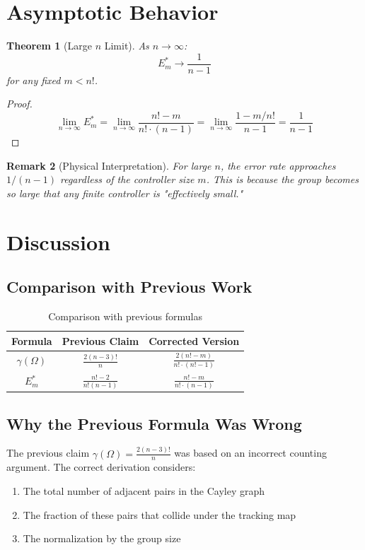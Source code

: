 \documentclass[11pt]{article}
\newtheorem{theorem}{Theorem}[section]
\newtheorem{remark}[theorem]{Remark}
\begin{document}
\section{Asymptotic Behavior}

\begin{theorem}[Large $n$ Limit]
As $n \to \infty$:
$$E_m^* \to \frac{1}{n-1}$$
for any fixed $m < n!$.
\end{theorem}

\begin{proof}
$$\lim_{n \to \infty} E_m^* = \lim_{n \to \infty} \frac{n! - m}{n! \cdot (n-1)} = \lim_{n \to \infty} \frac{1 - m/n!}{n-1} = \frac{1}{n-1}$$
\end{proof}

\begin{remark}[Physical Interpretation]
For large $n$, the error rate approaches $1/(n-1)$ regardless of the controller size $m$. This is because the group becomes so large that any finite controller is "effectively small."
\end{remark}

\section{Discussion}

\subsection{Comparison with Previous Work}

\begin{table}[h]
\centering
\caption{Comparison with previous formulas}
\begin{tabular}{ccc}
\toprule
Formula & Previous Claim & Corrected Version \\
\midrule
$\gamma(\Omega)$ & $\frac{2(n-3)!}{n}$ & $\frac{2(n! - m)}{n! \cdot (n! - 1)}$ \\
$E_m^*$ & $\frac{n!-2}{n!(n-1)}$ & $\frac{n! - m}{n! \cdot (n-1)}$ \\
\bottomrule
\end{tabular}
\end{table}

\subsection{Why the Previous Formula Was Wrong}

The previous claim $\gamma(\Omega) = \frac{2(n-3)!}{n}$ was based on an incorrect counting argument. The correct derivation considers:
\begin{enumerate}
    \item The total number of adjacent pairs in the Cayley graph
    \item The fraction of these pairs that collide under the tracking map
    \item The normalization by the group size
\end{enumerate}
\end{document}
